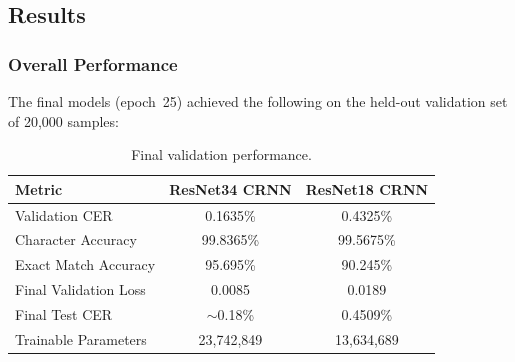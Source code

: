 \documentclass[conference]{IEEEtran}
\begin{document}
\subsection{Results}

\subsubsection{Overall Performance}

The final models (epoch~25) achieved the following on the held-out validation
set of 20,000 samples:

\begin{table}[htbp]
\centering
\caption{Final validation performance.}
\label{tab:results}
\begin{tabular}{@{}lcc@{}}
\toprule
\textbf{Metric} & \textbf{ResNet34 CRNN} & \textbf{ResNet18 CRNN} \\
\midrule
Validation CER           & 0.1635\% & 0.4325\% \\
Character Accuracy       & 99.8365\% & 99.5675\% \\
Exact Match Accuracy     & 95.695\% & 90.245\% \\
Final Validation Loss    & 0.0085 & 0.0189 \\
Final Test CER           & $\sim$0.18\% & 0.4509\% \\
Trainable Parameters     & 23,742,849 & 13,634,689 \\
\bottomrule
\end{tabular}
\end{table}
\end{document}
